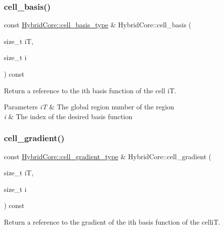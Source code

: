 \subsubsection{\texorpdfstring{cell\+\_\+basis()}{cell\_basis()}}
{\footnotesize\ttfamily const \hyperlink{classHArDCore2D_1_1HybridCore_a4b9c53f6ec13dc9e73f5cdc5c8ae782b}{Hybrid\+Core\+::cell\+\_\+basis\+\_\+type} \& Hybrid\+Core\+::cell\+\_\+basis (\begin{DoxyParamCaption}\item[{size\+\_\+t}]{iT,  }\item[{size\+\_\+t}]{i }\end{DoxyParamCaption}) const}



Return a reference to the i\textquotesingle{}th basis function of the cell iT. 


\begin{DoxyParams}{Parameters}
{\em iT} & The global region number of the region \\
\hline
{\em i} & The index of the desired basis function \\
\hline
\end{DoxyParams}
\mbox{\label{classHArDCore2D_1_1HybridCore_a710fc23b914623b90a2699ab4291e539}} 
\subsubsection{\texorpdfstring{cell\+\_\+gradient()}{cell\_gradient()}}
{\footnotesize\ttfamily const \hyperlink{classHArDCore2D_1_1HybridCore_a41350d7c3ac5a5a5e932348d2c9d0750}{Hybrid\+Core\+::cell\+\_\+gradient\+\_\+type} \& Hybrid\+Core\+::cell\+\_\+gradient (\begin{DoxyParamCaption}\item[{size\+\_\+t}]{iT,  }\item[{size\+\_\+t}]{i }\end{DoxyParamCaption}) const}



Return a reference to the gradient of the i\textquotesingle{}th basis function of the celliT. 

